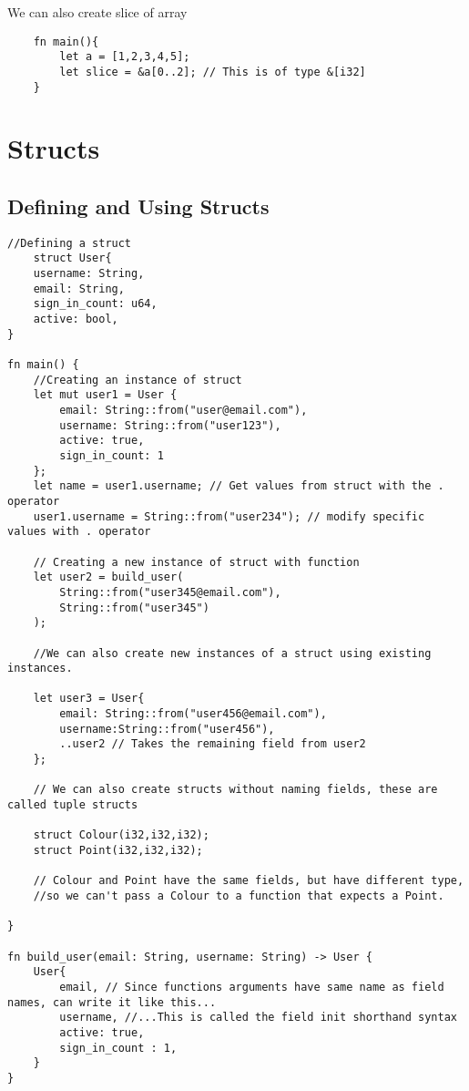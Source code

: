 We can also create slice of array 

\begin{lstlisting}
    fn main(){
        let a = [1,2,3,4,5];
        let slice = &a[0..2]; // This is of type &[i32]
    }
\end{lstlisting}

\newpage

\section{Structs}
\subsection{Defining and Using Structs}
\begin{lstlisting}
//Defining a struct
    struct User{ 
    username: String,
    email: String,
    sign_in_count: u64,
    active: bool,
}

fn main() {
    //Creating an instance of struct
    let mut user1 = User {
        email: String::from("user@email.com"),
        username: String::from("user123"),
        active: true,
        sign_in_count: 1
    };
    let name = user1.username; // Get values from struct with the . operator
    user1.username = String::from("user234"); // modify specific values with . operator
  
    // Creating a new instance of struct with function
    let user2 = build_user(
        String::from("user345@email.com"),
        String::from("user345")
    );

    //We can also create new instances of a struct using existing instances.

    let user3 = User{
        email: String::from("user456@email.com"),
        username:String::from("user456"),
        ..user2 // Takes the remaining field from user2
    };

    // We can also create structs without naming fields, these are called tuple structs

    struct Colour(i32,i32,i32);
    struct Point(i32,i32,i32);

    // Colour and Point have the same fields, but have different type, 
    //so we can't pass a Colour to a function that expects a Point.

}

fn build_user(email: String, username: String) -> User {
    User{
        email, // Since functions arguments have same name as field names, can write it like this...
        username, //...This is called the field init shorthand syntax
        active: true,
        sign_in_count : 1,
    }
}
\end{lstlisting}
\newpage

